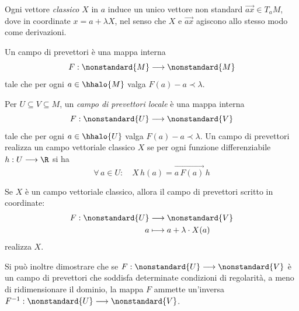 Ogni vettore \emph{classico} $ X $ in $ a $ induce un unico vettore non standard $ \vec{ax} \in T_{a}M $, dove in coordinate $ x = a+ \lambda X $, nel senso che $ X $ e $ \vec{ax} $ agiscono allo stesso modo come derivazioni.

Un campo di prevettori è una mappa interna \begin{equation*}
    F: \nonstandard{M} \longrightarrow \nonstandard{M}
\end{equation*}tale che per ogni $ a \in \hhalo{M} $ valga $ F(a) -a\prec \lambda$.

Per $ U \subseteq V \subseteq M $, un \emph{campo di prevettori locale} è una mappa interna \begin{equation*}
    F: \nonstandard{U} \longrightarrow \nonstandard{V}
\end{equation*}tale che per ogni $ a \in \hhalo{U} $ valga $ F(a)-a \prec \lambda$. Un campo di prevettori realizza un campo vettoriale classico $ X $ se per ogni funzione differenziabile $ h: U \longrightarrow \R $ si ha \begin{equation*}
    \forall\, a \in U:\quad X\,h(a) = \vec{a\,F(a)}\,h
\end{equation*}

Se $ X $ è un campo vettoriale classico, allora il campo di prevettori scritto in coordinate: \begin{align*}
F:\nonstandard{U} &\longrightarrow \nonstandard{V} \\
a &\longmapsto a + \lambda \cdot X(a)
\end{align*}realizza $ X $.



Si può inoltre dimostrare che se $ F: \nonstandard{U} \longrightarrow \nonstandard{V} $ è un campo di prevettori che soddisfa determinate condizioni di regolarità, a meno di ridimensionare il dominio, la mappa $ F $ ammette un'inversa $ F^{-1}: \nonstandard{U} \longrightarrow \nonstandard{V} $.

